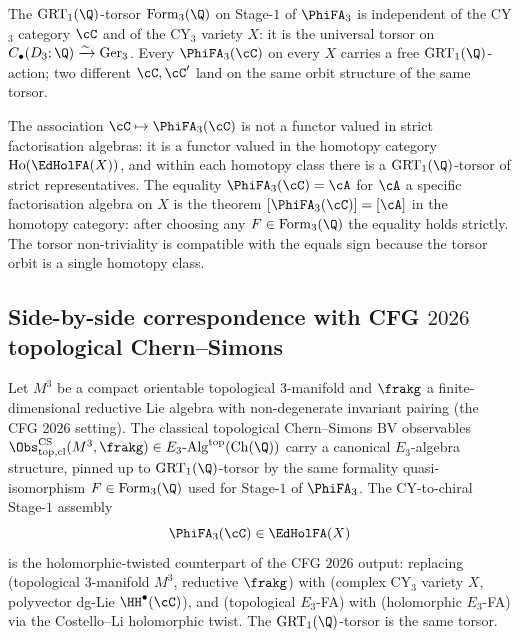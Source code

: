 \begin{corollary}
\label{cor:torsor-universality-across-cy3}
\ClaimStatusTheorem
The $\mathrm{GRT}_1(\Q)$-torsor $\mathrm{Form}_3(\Q)$ on Stage-$1$ of
$\PhiFA_3$ is independent of the CY$_3$ category $\cC$ and of the CY$_3$
variety $X$: it is the universal torsor on
$C_\bullet(D_3; \Q) \xrightarrow{\sim} \mathrm{Ger}_3$. Every
$\PhiFA_3(\cC)$ on every $X$ carries a free $\mathrm{GRT}_1(\Q)$-action;
two different $\cC, \cC'$ land on the same orbit structure of the same
torsor.
\end{corollary}

\begin{remark}
\label{rem:equals-sign-at-cy3-torsor}
The association $\cC \mapsto \PhiFA_3(\cC)$ is not a functor valued in
strict factorisation algebras: it is a functor valued in the homotopy
category $\mathrm{Ho}(\EdHolFA(X))$, and within each homotopy class
there is a $\mathrm{GRT}_1(\Q)$-torsor of strict representatives. The
equality $\PhiFA_3(\cC) = \cA$ for $\cA$ a specific factorisation algebra
on $X$ is the theorem $[\PhiFA_3(\cC)] = [\cA]$ in the homotopy
category: after choosing any $F \in \mathrm{Form}_3(\Q)$ the equality
holds strictly. The torsor non-triviality is compatible with the equals
sign because the torsor orbit is a single homotopy class.
\end{remark}

\subsection*{Side-by-side correspondence with CFG $2026$ topological Chern--Simons}

\begin{theorem}
\label{thm:cfg-phi-e3-correspondence}
\ClaimStatusConditional
Let $M^3$ be a compact orientable topological $3$-manifold and
$\frakg$ a finite-dimensional reductive Lie algebra with non-degenerate
invariant pairing (the CFG $2026$ setting). The classical topological
Chern--Simons BV observables
$\Obs^{\mathrm{CS}}_{\mathrm{top,cl}}(M^3, \frakg) \in
E_3\text{-}\mathrm{Alg}^{\mathrm{top}}(\mathrm{Ch}(\Q))$ carry a canonical $E_3$-algebra
structure, pinned up to $\mathrm{GRT}_1(\Q)$-torsor by the same
formality quasi-isomorphism $F \in \mathrm{Form}_3(\Q)$ used for
Stage-$1$ of $\PhiFA_3$. The CY-to-chiral Stage-$1$ assembly
\[
 \PhiFA_3(\cC) \in \EdHolFA(X)
\]
is the holomorphic-twisted counterpart of the CFG $2026$ output:
replacing (topological $3$-manifold $M^3$, reductive $\frakg$) with
(complex CY$_3$ variety $X$, polyvector dg-Lie $\HH^\bullet(\cC)$),
and (topological $E_3$-FA) with (holomorphic $E_3$-FA) via the
Costello--Li holomorphic twist. The $\mathrm{GRT}_1(\Q)$-torsor is the
same torsor.
\end{theorem}

